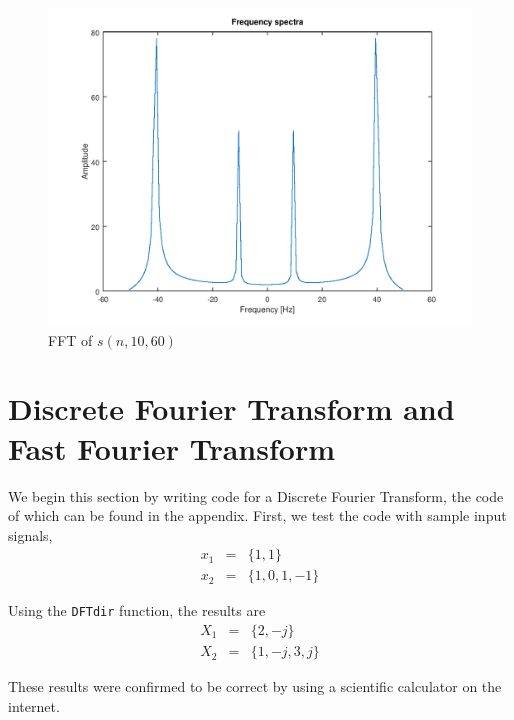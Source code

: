 \documentclass[a4paper, 12pt]{report}
\begin{document}
			\begin{figure}[H]
				\label{fig:19}
				\includegraphics[width=\textwidth]{img/1_19.png}
				\caption{FFT of $s(n, 10, 60)$}
			\end{figure}

	\chapter{Discrete Fourier Transform and Fast Fourier Transform} %
	\label{cha:discrete_fourier_transform_and_fast_fourier_transform}
		We begin this section by writing code for a Discrete Fourier Transform, the code of which can be found in the appendix. First, we test the code with sample input signals,
		\[
			\begin{array}{rcl}
				x_1 & = & \{1, 1\} \\
				x_2 & = & \{1, 0, 1, -1\}
			\end{array}
		\]

		\noindent Using the \texttt{DFTdir} function, the results are
		\[
			\begin{array}{rcl}
				X_1 & = & \{2, -j\} \\
				X_2 & = & \{1,-j,3,j\}
			\end{array}
		\]

		These results were confirmed to be correct by using a scientific calculator on the internet.

	\appendix
\end{document}
